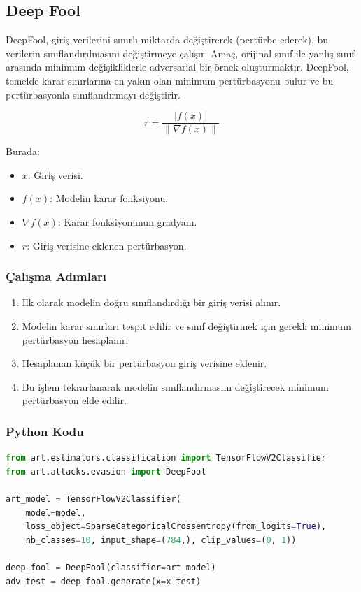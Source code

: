 \newpage

\subsection{Deep Fool}

DeepFool, giriş verilerini sınırlı miktarda değiştirerek (pertürbe ederek), bu verilerin sınıflandırılmasını değiştirmeye çalışır. Amaç, orijinal sınıf ile yanlış sınıf arasında minimum değişikliklerle adversarial bir örnek oluşturmaktır. DeepFool, temelde karar sınırlarına en yakın olan minimum pertürbasyonu bulur ve bu pertürbasyonla sınıflandırmayı değiştirir.

\[ r = \frac{| f(x) |}{\|\nabla f(x)\|} \]

Burada:

\begin{itemize}
    \item $x$: Giriş verisi.
    \item $f(x)$: Modelin karar fonksiyonu.
    \item $\nabla f(x)$: Karar fonksiyonunun gradyanı.
    \item $r$: Giriş verisine eklenen pertürbasyon.
\end{itemize}

\subsubsection{Çalışma Adımları}

\begin{enumerate}
    \item İlk olarak modelin doğru sınıflandırdığı bir giriş verisi alınır.
    \item Modelin karar sınırları tespit edilir ve sınıf değiştirmek için gerekli minimum pertürbasyon hesaplanır.
    \item Hesaplanan küçük bir pertürbasyon giriş verisine eklenir.
    \item Bu işlem tekrarlanarak modelin sınıflandırmasını değiştirecek minimum pertürbasyon elde edilir.
\end{enumerate}

\subsubsection{Python Kodu}

\begin{lstlisting}[language=Python]
from art.estimators.classification import TensorFlowV2Classifier
from art.attacks.evasion import DeepFool

art_model = TensorFlowV2Classifier(
    model=model, 
    loss_object=SparseCategoricalCrossentropy(from_logits=True), 
    nb_classes=10, input_shape=(784,), clip_values=(0, 1))

deep_fool = DeepFool(classifier=art_model)
adv_test = deep_fool.generate(x=x_test)
\end{lstlisting}

